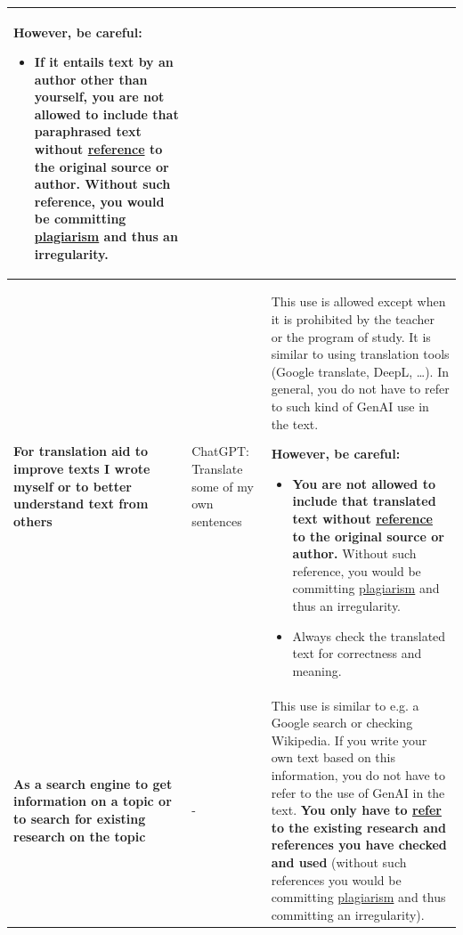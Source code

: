 \begin{longtable}{|p{}|p{}|p{}|}
\textbf{However, be careful}: 
\begin{itemize}
    \item If it entails text by an author other than yourself, \textbf{you are not allowed to include that paraphrased text without \href{https://bib.kuleuven.be/english/training-and-tutorials/citation}{reference} to the original source or author}. Without such reference, you would be committing \href{https://www.kuleuven.be/english/education/plagiarism/index}{plagiarism} and thus an irregularity.
\end{itemize} \\ \hline
\textbf{For translation aid to improve texts I wrote myself or to better understand text from others} & ChatGPT: Translate some of my own sentences & This use is allowed except when it is prohibited by the teacher or the program of study. It is similar to using translation tools (Google translate, DeepL, …). In general, you do not have to refer to such kind of GenAI use in the text. 

\textbf{However, be careful:} 
\begin{itemize}
    \item \textbf{You are not allowed to include that translated text without \href{https://bib.kuleuven.be/english/training-and-tutorials/citation}{reference} to the original source or author.} Without such reference, you would be committing \href{https://www.kuleuven.be/english/education/plagiarism/index}{plagiarism} and thus an irregularity.
    \item Always check the translated text for correctness and meaning.
\end{itemize} \\ \hline
\textbf{As a search engine to get information on a topic or to search for existing research on the topic} & - & This use is similar to e.g. a Google search or checking Wikipedia. If you write your own text based on this information, you do not have to refer to the use of GenAI in the text. \textbf{You only have to \href{https://bib.kuleuven.be/english/training-and-tutorials/citation}{refer} to the existing research and references you have checked and used }(without such references you would be committing \href{https://www.kuleuven.be/english/education/plagiarism/index}{plagiarism} and thus committing an irregularity).


\end{longtable}
